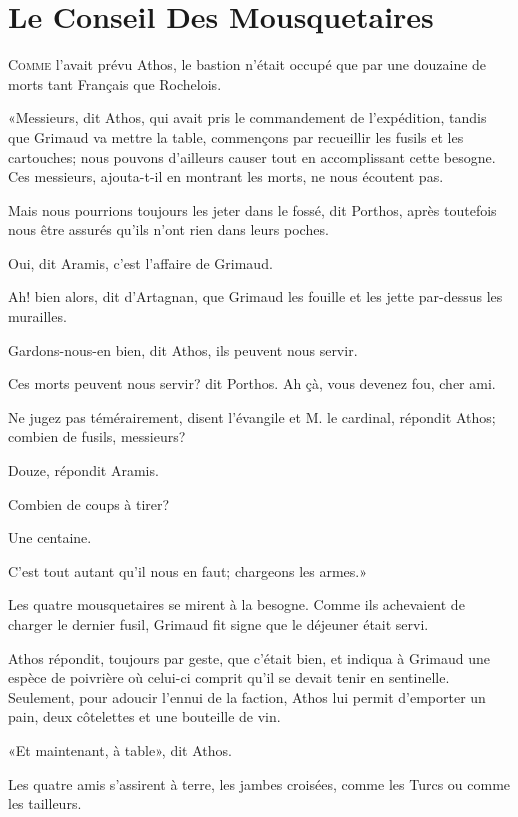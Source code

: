
\chapter{Le Conseil Des Mousquetaires}

\lettrine{C}{omme} l'avait prévu Athos, le bastion n'était occupé que par une douzaine de morts tant Français que Rochelois. 

\zz
«Messieurs, dit Athos, qui avait pris le commandement de l'expédition, tandis que Grimaud va mettre la table, commençons par recueillir les fusils et les cartouches; nous pouvons d'ailleurs causer tout en accomplissant cette besogne. Ces messieurs, ajouta-t-il en montrant les morts, ne nous écoutent pas. 

\speak  Mais nous pourrions toujours les jeter dans le fossé, dit Porthos, après toutefois nous être assurés qu'ils n'ont rien dans leurs poches. 

\speak  Oui, dit Aramis, c'est l'affaire de Grimaud. 

\speak  Ah! bien alors, dit d'Artagnan, que Grimaud les fouille et les jette par-dessus les murailles. 

\speak  Gardons-nous-en bien, dit Athos, ils peuvent nous servir. 

\speak  Ces morts peuvent nous servir? dit Porthos. Ah çà, vous devenez fou, cher ami. 

\speak  Ne jugez pas témérairement, disent l'évangile et M. le cardinal, répondit Athos; combien de fusils, messieurs? 

\speak  Douze, répondit Aramis. 

\speak  Combien de coups à tirer? 

\speak  Une centaine. 

\speak  C'est tout autant qu'il nous en faut; chargeons les armes.» 

Les quatre mousquetaires se mirent à la besogne. Comme ils achevaient de charger le dernier fusil, Grimaud fit signe que le déjeuner était servi. 

Athos répondit, toujours par geste, que c'était bien, et indiqua à Grimaud une espèce de poivrière où celui-ci comprit qu'il se devait tenir en sentinelle. Seulement, pour adoucir l'ennui de la faction, Athos lui permit d'emporter un pain, deux côtelettes et une bouteille de vin. 

«Et maintenant, à table», dit Athos. 

Les quatre amis s'assirent à terre, les jambes croisées, comme les Turcs ou comme les tailleurs. 

